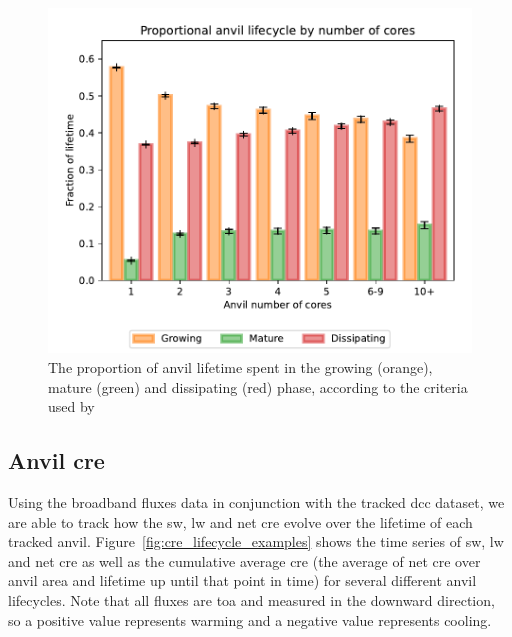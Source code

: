 \documentclass[acp, manuscript]{copernicus}
\begin{document}
\begin{figure}[tp]
    \includegraphics[width=12cm]{figures/fig09.pdf}
    \caption[
    The proportion of anvil lifetime spent in the growing, mature and dissipating phase
    ]{
    The proportion of anvil lifetime spent in the growing (orange), mature (green) and dissipating (red) phase, according to the criteria used by \citet{futyan_deep_2007}
    }
    \label{fig:seviri_lifetime_proportions}
\end{figure}


\subsection{Anvil \acrshort{cre}}

Using the broadband fluxes data in conjunction with the tracked \acrshort{dcc} dataset, we are able to track how the \acrshort{sw}, \acrshort{lw} and net \acrshort{cre} evolve over the lifetime of each tracked anvil.
Figure~\ref{fig:cre_lifecycle_examples} shows the time series of \acrshort{sw}, \acrshort{lw} and net \acrshort{cre} as well as the cumulative average \acrshort{cre} (the average of net \acrshort{cre} over anvil area and lifetime up until that point in time) for several different anvil lifecycles.
Note that all fluxes are \acrshort{toa} and measured in the downward direction, so a positive value represents warming and a negative value represents cooling.
\end{document}
